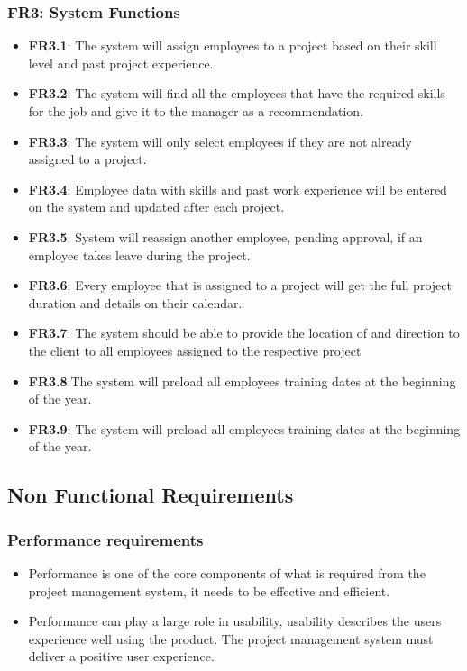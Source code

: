 \documentclass[a4paper,12pt]{article}
\begin{document}
	\subsubsection{FR3: System Functions}
	\begin{itemize}
		\item \textbf{FR3.1}: The system will assign employees to a project based
		on their skill level and past project experience. 
		
		\item \textbf{FR3.2}: The system will find all the employees that have the required skills     for the job and give it to the manager as a recommendation.
		
		\item \textbf{FR3.3}: The system will only select employees if they are not already           assigned to a project.
		
		\item \textbf{FR3.4}: Employee data with skills and past work experience
		will be entered on the system and updated after each project. 
		
		\item \textbf{FR3.5}: System will reassign another employee, pending 
		approval, if an employee takes leave during the project.
		
		\item \textbf{FR3.6}: Every employee that is assigned to a project will get
		the full project duration and details on their calendar. 
		
		\item \textbf{FR3.7}: The system should be able to provide the location of and direction      to the client to all employees assigned to the respective project
		
		\item \textbf{FR3.8}:The system will preload all employees training dates
		at the beginning of the year. 
		
		
		\item \textbf{FR3.9}: The system will preload all employees training dates at the beginning of the year.
	\end{itemize}
	

\subsection{Non Functional Requirements}
 \subsubsection{Performance requirements}
    \begin{itemize}
        \item Performance is one of the core components of what is required from the project management system, it needs to be effective and efficient.
        
        \item Performance can play a large role in usability, usability describes the users experience well using the product. The project management system must deliver a positive user experience. 
    \end{itemize}
    
\end{document}
